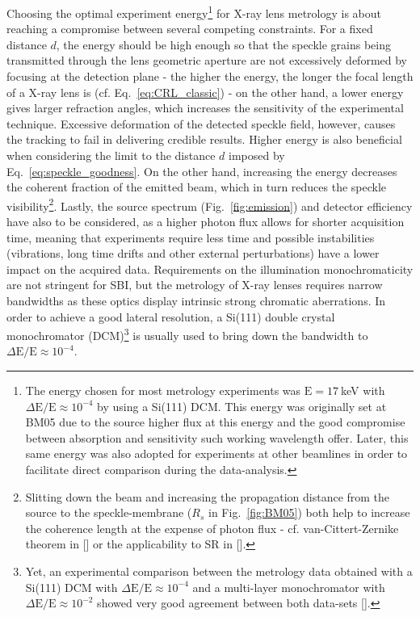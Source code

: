\begin{refsection}
Choosing the optimal experiment energy\footnote{The energy chosen for most metrology experiments was $\text{E}=17~$keV with $\Delta \text{E}/\text{E}\approx10^{-4}$ by using a Si(111) DCM. This energy was originally set at BM05 due to the source higher flux at this energy and the good compromise between absorption and sensitivity such working wavelength offer. Later, this same energy was also adopted for experiments at other beamlines in order to facilitate direct comparison during the data-analysis.} for X-ray lens metrology is about reaching a compromise between several competing constraints. For a fixed distance $d$, the energy should be high enough so that the speckle grains being transmitted through the lens geometric aperture are not excessively deformed by focusing at the detection plane - the higher the energy, the longer the focal length of a X-ray lens is (cf. Eq.~\ref{eq:CRL_classic}) - on the other hand, a lower energy gives larger refraction angles, which increases the sensitivity of the experimental technique. Excessive deformation of the detected speckle field, however, causes the tracking to fail in delivering credible results. Higher energy is also beneficial when considering the limit to the distance $d$ imposed by Eq.~\ref{eq:speckle_goodness}. On the other hand, increasing the energy decreases the coherent fraction of the emitted beam, which in turn reduces the speckle visibility\footnote{Slitting down the beam and increasing the propagation distance from the source to the speckle-membrane ($R_s$ in Fig.~\ref{fig:BM05}) both help to increase the coherence length at the expense of photon flux - cf. van-Cittert-Zernike theorem in [\cite[\textit{§4.4.4}]{Mandel1995}] or the applicability to SR in [\cite[\textit{§4}]{Geloni2008}].}. Lastly, the source spectrum (Fig.~\ref{fig:emission}) and detector efficiency have also to be considered, as a higher photon flux allows for shorter acquisition time, meaning that experiments require less time and possible instabilities (vibrations, long time drifts and other external perturbations) have a lower impact on the acquired data. Requirements on the illumination monochromaticity are not stringent for SBI, but the metrology of X-ray lenses requires narrow bandwidths as these optics display intrinsic strong chromatic aberrations. In order to achieve a good lateral resolution, a Si(111) double crystal monochromator (DCM)\footnote{Yet, an experimental comparison between the metrology data obtained with a Si(111) DCM with $\Delta \text{E}/\text{E}\approx10^{-4}$ and a multi-layer monochromator with $\Delta \text{E}/\text{E}\approx10^{-2}$ showed very good agreement between both data-sets [\cite[\textit{\S3.3.3}]{Berujon2020a}].} is usually used to bring down the bandwidth to $\Delta \text{E}/\text{E}\approx10^{-4}$.


\end{refsection}
